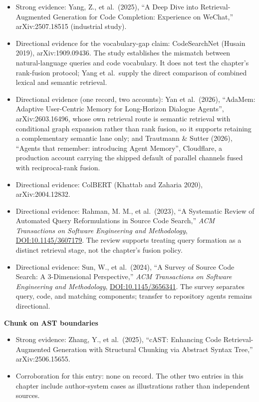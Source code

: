 \begin{itemize}
\tightlist
\item
  Strong evidence: Yang, Z., et al.~(2025), ``A Deep Dive into Retrieval-Augmented Generation for Code Completion: Experience on WeChat,'' arXiv:2507.18515 (industrial study).
\item
  Directional evidence for the vocabulary-gap claim: CodeSearchNet (Husain 2019), arXiv:1909.09436. The study establishes the mismatch between natural-language queries and code vocabulary. It does not test the chapter's rank-fusion protocol; Yang et al.~supply the direct comparison of combined lexical and semantic retrieval.
\item
  Directional evidence (one record, two accounts): Yan et al.~(2026), ``AdaMem: Adaptive User-Centric Memory for Long-Horizon Dialogue Agents'', arXiv:2603.16496, whose own retrieval route is semantic retrieval with conditional graph expansion rather than rank fusion, so it supports retaining a complementary semantic lane only; and Trautmann \& Sutter (2026), {``Agents that remember: introducing Agent Memory''}, Cloudflare, a production account carrying the shipped default of parallel channels fused with reciprocal-rank fusion.
\item
  Directional evidence: ColBERT (Khattab and Zaharia 2020), arXiv:2004.12832.
\item
  Directional evidence: Rahman, M. M., et al.~(2023), ``A Systematic Review of Automated Query Reformulations in Source Code Search,'' \emph{ACM Transactions on Software Engineering and Methodology}, \href{https://doi.org/10.1145/3607179}{DOI:10.1145/3607179}. The review supports treating query formation as a distinct retrieval stage, not the chapter's fusion policy.
\item
  Directional evidence: Sun, W., et al.~(2024), ``A Survey of Source Code Search: A 3-Dimensional Perspective,'' \emph{ACM Transactions on Software Engineering and Methodology}, \href{https://doi.org/10.1145/3656341}{DOI:10.1145/3656341}. The survey separates query, code, and matching components; transfer to repository agents remains directional.
\end{itemize}

\textbf{Chunk on AST boundaries}

\begin{itemize}
\tightlist
\item
  Strong evidence: Zhang, Y., et al.~(2025), ``cAST: Enhancing Code Retrieval-Augmented Generation with Structural Chunking via Abstract Syntax Tree,'' arXiv:2506.15655.
\item
  Corroboration for this entry: none on record. The other two entries in this chapter include author-system cases as illustrations rather than independent sources.
\end{itemize}
